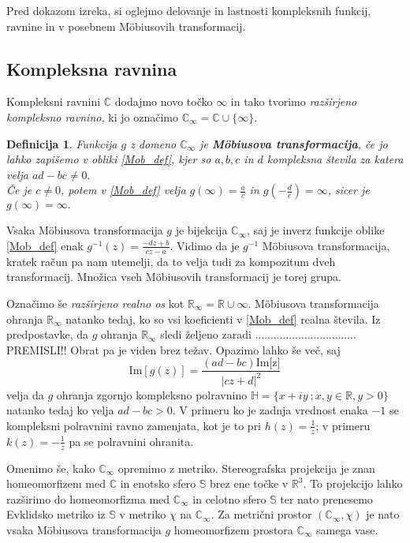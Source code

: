 \documentclass[a4paper,12pt]{article}
\def\R{\mathbb{R}} %
\def\C{\mathbb{C}} %
\def\Ci{\mathbb{C}_{\infty}} %
\def\H{\mathbb{H}} %
\newtheorem{definicija}{Definicija}
\begin{document}
Pred dokazom izreka, si oglejmo delovanje in lastnosti kompleksnih funkcij, ravnine in v posebnem M\"{o}biusovih transformacij.

\subsection{Kompleksna ravnina}
Kompleksni ravnini $\C$ dodajmo novo točko $\infty$ in tako tvorimo \emph{razširjeno kompleksno ravnino,} ki jo označimo $\Ci = \C \cup \{\infty\}$.
\begin{definicija}
Funkcija $g$ z domeno $\Ci$ je \textbf{M\"{o}biusova transformacija}, če jo lahko zapišemo v obliki \eqref{Mob_def}, kjer so $a, b, c$ in $d$ kompleksna števila za katera velja $ad - bc \neq 0.$ \\
Če je $c \neq 0$, potem v \eqref{Mob_def} velja $g(\infty) = \frac{a}{c}$ in $g(-\frac{d}{c}) = \infty$, sicer je $g(\infty) = \infty.$
\end{definicija}

Vsaka M\"{o}biusova transformacija $g$ je bijekcija $\Ci$, saj je inverz funkcije oblike \eqref{Mob_def} enak $g^{-1}(z) = \frac{-dz + b}{cz - a}$. Vidimo da je $g^{-1}$ M\"{o}biusova transformacija, kratek račun pa nam utemelji, da to velja tudi za kompozitum dveh transformacij. Množica vseh M\"{o}biusovih transformacij je torej grupa.  

Označimo še \emph{razširjeno realno os} kot $\R_{\infty} = \R \cup \infty$. M\"{o}biusova transformacija ohranja $\R_\infty$ natanko tedaj, ko so vsi koeficienti v \eqref{Mob_def} realna števila. Iz predpostavke, da $g$ ohranja $\R_\infty$ sledi željeno zaradi ................................. PREMISLI!!
Obrat pa je viden brez težav. Opazimo lahko še več, saj
\[
    \text{Im}[g(z)] = \frac{(ad - bc)\text{Im[z]}}{|cz + d|^2}  
\]
velja da $g$ ohranja zgornjo kompleksno polravnino $\H = \{x + iy\ ; x, y \in \R, y > 0\}$ natanko tedaj ko velja $ad - bc > 0$. V primeru ko je zadnja vrednost enaka $-1$ se kompleksni polravnini ravno zamenjata, kot je to pri $h(z) = \frac{1}{z}$; v primeru $k(z) = - \frac{1}{z}$ pa se polravnini ohranita.

Omenimo še, kako $\Ci$ opremimo z metriko. Stereografska projekcija je znan 
homeomorfizem med $\C$ in enotsko sfero $\mathbb{S}$ brez ene točke v $\R^3$. To projekcijo lahko razširimo do homeomorfizma med $\Ci$ in celotno sfero $\mathbb{S}$ ter nato prenesemo Evklidsko metriko iz $\mathbb{S}$ v metriko $\chi$ na $\Ci$. Za metrični prostor $(\Ci, \chi)$ je nato vsaka M\"{o}biusova transformacija $g$ homeomorfizem prostora $\Ci$ samega vase.
\end{document}
